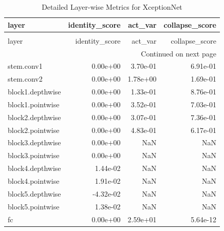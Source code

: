 \begin{longtable}{lrrr}
\caption{Detailed Layer-wise Metrics for XceptionNet} \label{tab:layer_metrics_xceptionnet} \\
\toprule
layer & identity_score & act_var & collapse_score \\
\midrule
\endfirsthead
\caption[]{Detailed Layer-wise Metrics for XceptionNet} \\
\toprule
layer & identity_score & act_var & collapse_score \\
\midrule
\endhead
\midrule
\multicolumn{4}{r}{Continued on next page} \\
\midrule
\endfoot
\bottomrule
\endlastfoot
stem.conv1 & 0.00e+00 & 3.70e-01 & 6.91e-01 \\
stem.conv2 & 0.00e+00 & 1.78e+00 & 1.69e-01 \\
block1.depthwise & 0.00e+00 & 1.33e-01 & 8.76e-01 \\
block1.pointwise & 0.00e+00 & 3.52e-01 & 7.03e-01 \\
block2.depthwise & 0.00e+00 & 3.07e-01 & 7.36e-01 \\
block2.pointwise & 0.00e+00 & 4.83e-01 & 6.17e-01 \\
block3.depthwise & 0.00e+00 & NaN & NaN \\
block3.pointwise & 0.00e+00 & NaN & NaN \\
block4.depthwise & 1.44e-02 & NaN & NaN \\
block4.pointwise & 1.91e-02 & NaN & NaN \\
block5.depthwise & -4.32e-02 & NaN & NaN \\
block5.pointwise & 1.38e-02 & NaN & NaN \\
fc & 0.00e+00 & 2.59e+01 & 5.64e-12 \\
\end{longtable}
